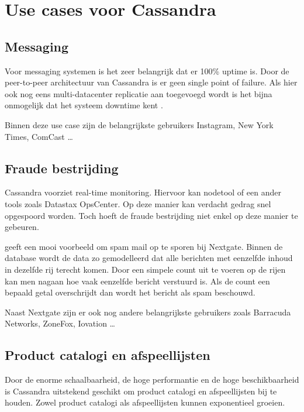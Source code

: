 \chapter{Use cases voor Cassandra}
\label{ch:cassandra_ucs}

\section{Messaging}
Voor messaging systemen is het zeer belangrijk dat er 100\% uptime is.
Door de peer-to-peer architectuur van Cassandra is er geen single point of failure.
Als hier ook nog eens multi-datacenter replicatie aan toegevoegd wordt is het bijna onmogelijk dat het systeem downtime kent \citep{Chan2014Messaging}.

Binnen deze use case zijn de belangrijkste gebruikers Instagram, New York Times, ComCast \dots

\section{Fraude bestrijding}
Cassandra voorziet real-time monitoring.
Hiervoor kan nodetool of een ander tools zoals Datastax OpsCenter.
Op deze manier kan verdacht gedrag snel opgespoord worden.
Toch hoeft de fraude bestrijding niet enkel op deze manier te gebeuren.

\cite{Nguyen2014Fraud} geeft een mooi voorbeeld om spam mail op te sporen bij Nextgate.
Binnen de database wordt de data zo gemodelleerd dat alle berichten met eenzelfde inhoud in dezelfde rij terecht komen.
Door een simpele count uit te voeren op de rijen kan men nagaan hoe vaak eenzelfde bericht verstuurd is.
Als de count een bepaald getal overschrijdt dan wordt het bericht als spam beschouwd.

Naast Nextgate zijn er ook nog andere belangrijkste gebruikers zoals Barracuda Networks, ZoneFox, Iovation \dots

\section{Product catalogi en afspeellijsten}
Door de enorme schaalbaarheid, de hoge performantie en de hoge beschikbaarheid is Cassandra uitstekend geschikt om product catalogi en afspeellijsten bij te houden.
Zowel product catalogi als afspeellijsten kunnen exponentieel groeien.

